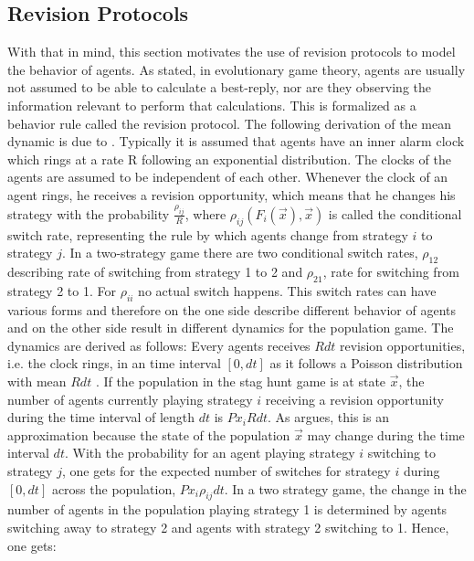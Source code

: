 \documentclass[11pt]{article}
\begin{document}
\subsection{Revision Protocols}
\label{sec:revisionprotocols}
With that in mind, this section motivates the use of revision protocols to
model the behavior of agents.
As stated, in evolutionary game theory, agents are usually not assumed to be 
able to calculate a best-reply, nor are they observing the information relevant
to perform that calculations. This is formalized as a behavior rule called
the revision protocol. The following derivation of the mean dynamic is due to 
\textcite{sandholm_population_2010}. Typically it is 
assumed that agents have an inner alarm clock which rings at a rate R 
following an exponential distribution. The clocks of the agents are assumed
to be independent of each other. Whenever the clock of an agent rings, he
receives a revision opportunity, which means that he changes his strategy
with the probability $\frac{\rho_{ij}}{R}$, where
$\rho_{ij}(F_i(\vec{x}),\vec{x})$ is called the conditional switch rate,
representing the rule by which agents change from strategy $i$ to strategy $j$. 
In a two-strategy game there are two conditional switch rates, $\rho_{12}$ 
describing rate of switching from strategy 1 to 2 and $\rho_{21}$, 
rate for switching from strategy 2 to 1. For $\rho_{ii}$ no actual switch 
happens. This switch rates can have various forms and therefore on the one 
side describe different behavior of agents and on the other side result in 
different dynamics for the population game.
The dynamics are derived as follows:
Every agents receives $R dt$ revision opportunities, i.e. the clock rings, 
in an time interval $[0,dt]$ as it follows a Poisson distribution with
mean $Rdt$ \parencite[123]{sandholm_population_2010}. 
If the population in the stag hunt game is at state $\vec{x}$, the number 
of agents currently playing strategy $i$ receiving a revision opportunity 
during the time interval of length $dt$ is $Px_i R dt$. As 
\textcite{sandholm_population_2010} argues, this is an approximation because
the state of the population $\vec{x}$ may change during the time interval $dt$.
With the probability for an agent playing strategy $i$ switching to strategy
$j$, one gets for the expected number of switches for strategy $i$ during 
$[0,dt]$ across the population,  $P x_i \rho_{ij} dt$. 
In a two strategy game, the change in the number of agents in the population 
playing  strategy 1 is determined by agents switching away to strategy 2 
and agents with strategy 2 switching to 1. Hence, one gets:
\end{document}
